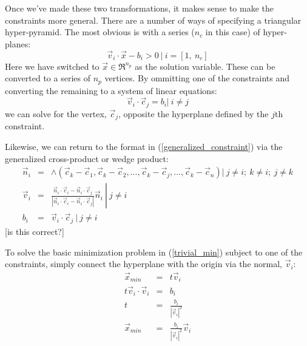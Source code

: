 \documentclass{article}
\begin{document}
Once we've made these two transformations, it makes sense to make the constraints
more general.  There are a number of ways of specifying a triangular
hyper-pyramid.  The most obvious is with a series ($n_c$ in this case) of hyper-
planes:
\begin{equation}
	\vec v_i \cdot \vec x - b_i > 0 ~ | ~ i=[1, ~n_c]
\label{generalized_constraint}
\end{equation}
Here we have switched to $\vec x \in \Re^{n_p}$ as the solution variable.  These can be 
converted to a series of $n_p$ vertices.  By ommitting one of the constraints
and converting the remaining to a system of linear equations:
\begin{equation}
\vec v_i \cdot \vec c_j = b_i | ~ i \ne j
\end{equation}
we can solve for the vertex, $\vec c_j$, opposite the hyperplane defined 
by the $j$th constraint.

Likewise, we can return to the format in (\ref{generalized_constraint}) via the
generalized cross-product or wedge product:
\begin{eqnarray}
	\vec n_i & = & \wedge \left (\vec c_k - \vec c_1,\vec c_k - \vec c_2,
	...,\vec c_k-\vec c_j,...,\vec c_k-\vec c_n \right ) 
	|~ j \ne i;~k \ne i;~j \ne k \\
	\vec v_i & = & 
	\left . 
	\frac{\vec n_i \cdot \vec c_i - \vec n_i \cdot \vec c_j}
	{\left | \vec n_i \cdot \vec c_i - \vec n_i \cdot \vec c_j \right |}
	\vec n_i
	~\right | ~j \ne i \\
	b_i & = & \vec v_i \cdot \vec c_j ~|~j \ne i
\end{eqnarray}
[is this correct?]

To solve the basic minimization problem in (\ref{trivial_min}) subject to
one of the constraints, simply connect the hyperplane with the origin via
the normal, $\vec v_i$:
\begin{eqnarray}
	\vec x_{min} & = & t \vec v_i \\
	t \vec v_i \cdot \vec v_i & = & b_i \\
	t & = & \frac{b_i}{|\vec v_i|^2} \\
	\vec x_{min} & = & \frac{b_i}{|\vec v_i |^2} \vec v_i \label{solution_1constraint}
\end{eqnarray}
\end{document}
